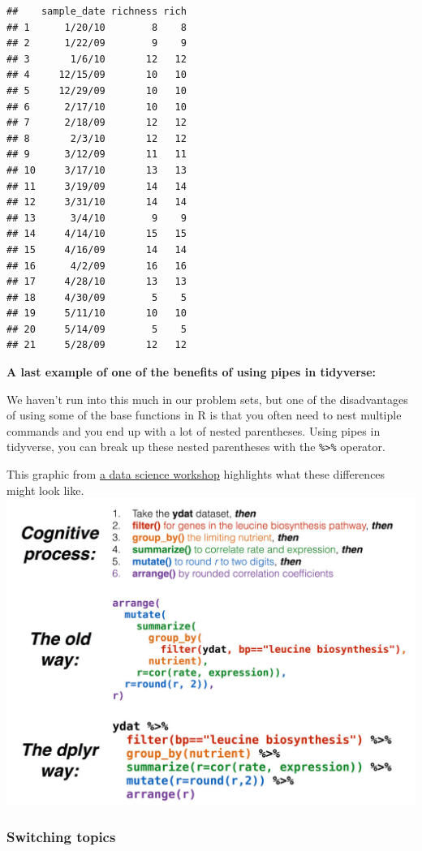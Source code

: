 \documentclass[
]{article}
\begin{document}
\begin{verbatim}
##    sample_date richness rich
## 1      1/20/10        8    8
## 2      1/22/09        9    9
## 3       1/6/10       12   12
## 4     12/15/09       10   10
## 5     12/29/09       10   10
## 6      2/17/10       10   10
## 7      2/18/09       12   12
## 8       2/3/10       12   12
## 9      3/12/09       11   11
## 10     3/17/10       13   13
## 11     3/19/09       14   14
## 12     3/31/10       14   14
## 13      3/4/10        9    9
## 14     4/14/10       15   15
## 15     4/16/09       14   14
## 16      4/2/09       16   16
## 17     4/28/10       13   13
## 18     4/30/09        5    5
## 19     5/11/10       10   10
## 20     5/14/09        5    5
## 21     5/28/09       12   12
\end{verbatim}

\textbf{A last example of one of the benefits of using pipes in
tidyverse:}

We haven't run into this much in our problem sets, but one of the
disadvantages of using some of the base functions in R is that you often
need to nest multiple commands and you end up with a lot of nested
parentheses. Using pipes in tidyverse, you can break up these nested
parentheses with the \texttt{\%\textgreater{}\%} operator.

This graphic from \href{https://4va.github.io/biodatasci/index.html}{a
data science workshop} highlights what these differences might look
like.\\
\includegraphics{nest_vs_pipe.jpg}

\hypertarget{switching-topics}{%
\subsubsection{Switching topics}\label{switching-topics}}
\end{document}
